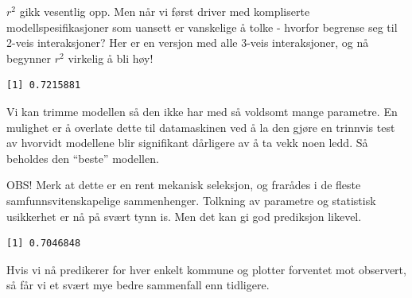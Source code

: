 \documentclass[
  letterpaper,
  DIV=11,
  numbers=noendperiod]{scrreprt}
\newenvironment{Shaded}{\begin{snugshade}}{\end{snugshade}}
\newcommand{\AttributeTok}[1]{\textcolor[rgb]{0.40,0.45,0.13}{#1}}
\newcommand{\ConstantTok}[1]{\textcolor[rgb]{0.56,0.35,0.01}{#1}}
\newcommand{\DecValTok}[1]{\textcolor[rgb]{0.68,0.00,0.00}{#1}}
\newcommand{\FunctionTok}[1]{\textcolor[rgb]{0.28,0.35,0.67}{#1}}
\newcommand{\NormalTok}[1]{\textcolor[rgb]{0.00,0.23,0.31}{#1}}
\newcommand{\OtherTok}[1]{\textcolor[rgb]{0.00,0.23,0.31}{#1}}
\newcommand{\SpecialCharTok}[1]{\textcolor[rgb]{0.37,0.37,0.37}{#1}}
\newcommand{\StringTok}[1]{\textcolor[rgb]{0.13,0.47,0.30}{#1}}
\theoremstyle{definition}
\theoremstyle{remark}
\begin{document}
\(r^2\) gikk vesentlig opp. Men når vi først driver med kompliserte
modellspesifikasjoner som uansett er vanskelige å tolke - hvorfor
begrense seg til 2-veis interaksjoner? Her er en versjon med alle 3-veis
interaksjoner, og nå begynner \(r^2\) virkelig å bli høy!

\begin{Shaded}
\end{Shaded}

\begin{verbatim}
[1] 0.7215881
\end{verbatim}

Vi kan trimme modellen så den ikke har med så voldsomt mange parametre.
En mulighet er å overlate dette til datamaskinen ved å la den gjøre en
trinnvis test av hvorvidt modellene blir signifikant dårligere av å ta
vekk noen ledd. Så beholdes den ``beste'' modellen.

OBS! Merk at dette er en rent mekanisk seleksjon, og frarådes i de
fleste samfunnsvitenskapelige sammenhenger. Tolkning av parametre og
statistisk usikkerhet er nå på svært tynn is. Men det kan gi god
prediksjon likevel.

\begin{Shaded}
\end{Shaded}

\begin{verbatim}
[1] 0.7046848
\end{verbatim}

Hvis vi nå predikerer for hver enkelt kommune og plotter forventet mot
observert, så får vi et svært mye bedre sammenfall enn tidligere.
\end{document}
